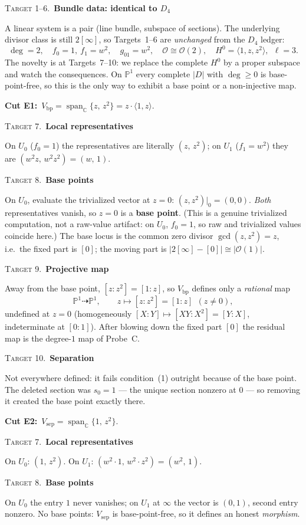 \documentclass[11pt]{article}
\newcommand{\PP}{\mathbb P}
\newcommand{\CC}{\mathbb C}
\newcommand{\OO}{\mathcal O}
\newcommand{\Span}{\operatorname{span}}
\newcommand{\target}[2]{\medskip\noindent%
  {\small\textsc{\textcolor{accent}{Target #1.}}}\ \textbf{\textcolor{inkblue}{#2}}\par\nopagebreak\smallskip}
\theoremstyle{plain}
\theoremstyle{definition}
\begin{document}
\target{1--6}{Bundle data: identical to \(D_4\)}
A linear system is a pair (line bundle, subspace of sections). The underlying
divisor class is still $2[\infty]$, so Targets~1--6 are \emph{unchanged} from the
$D_4$ ledger:
\[
  \deg=2,\quad f_0=1,\ f_1=w^2,\quad g_{01}=w^2,\quad \OO\cong\OO(2),\quad
  H^0=\langle1,z,z^2\rangle,\ \ \ell=3 .
\]
The novelty is at Targets~7--10: we replace the complete $H^0$ by a proper
subspace and watch the consequences. On $\PP^1$ every complete $|D|$ with
$\deg\ge0$ is base-point-free, so this is the only way to exhibit a base point or
a non-injective map.

\medskip
\noindent\textbf{Cut E1:}\ \(V_{\mathrm{bp}}=\Span_\CC\{z,\,z^2\}=z\cdot\langle1,z\rangle.\)

\target{7}{Local representatives}
On $U_0$ ($f_0=1$) the representatives are literally $(z,\,z^2)$; on $U_1$
($f_1=w^2$) they are $(w^2z,\,w^2z^2)=(w,\,1)$.

\target{8}{Base points}
On $U_0$, evaluate the trivialized vector at $z=0$: $(z,z^2)\big|_{0}=(0,0)$.
\emph{Both} representatives vanish, so $z=0$ is a \textbf{base point}. (This is a
genuine trivialized computation, not a raw-value artifact: on $U_0$, $f_0=1$, so
raw and trivialized values coincide here.) The base locus is the common zero
divisor $\gcd(z,z^2)=z$, i.e.\ the fixed part is $[0]$; the moving part is
$|2[\infty]-[0]|\cong|\OO(1)|$.

\target{9}{Projective map}
Away from the base point, $[z:z^2]=[1:z]$, so $V_{\mathrm{bp}}$ defines only a
\emph{rational} map
\[
  \PP^1\dashrightarrow\PP^1,\qquad z\mapsto[z:z^2]=[1:z]\ \ (z\neq0),
\]
undefined at $z=0$ (homogeneously $[X:Y]\mapsto[XY:X^2]=[Y:X]$, indeterminate at
$[0:1]$). After blowing down the fixed part $[0]$ the residual map is the
degree-$1$ map of Probe~C.

\target{10}{Separation}
Not everywhere defined: it fails condition~(1) outright because of the base
point. The deleted section was $s_0=1$ --- the unique section nonzero at $0$ ---
so removing it created the base point exactly there.

\medskip
\noindent\textbf{Cut E2:}\ \(V_{\mathrm{sep}}=\Span_\CC\{1,\,z^2\}.\)

\target{7}{Local representatives}
On $U_0$: $(1,\,z^2)$. On $U_1$: $(w^2\cdot1,\,w^2\cdot z^2)=(w^2,\,1)$.

\target{8}{Base points}
On $U_0$ the entry $1$ never vanishes; on $U_1$ at $\infty$ the vector is
$(0,1)$, second entry nonzero. No base points: $V_{\mathrm{sep}}$ is
base-point-free, so it defines an honest \emph{morphism}.
\end{document}
